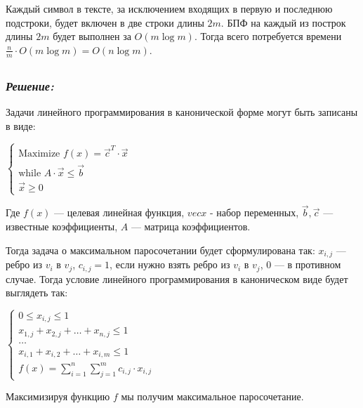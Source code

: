 \documentclass[a4paper, 12pt]{article}
\newcommand*\circled[1]{\tikz[baseline=(char.base)]{
            \node[shape=circle,draw,inner sep=2pt] (char) {#1};}}
\begin{document}
Каждый символ в тексте, за исключением входящих в первую и последнюю подстроки, будет включен в две строки длины $2m$. БПФ на каждый из построк длины $2m$ будет выполнен за $O(m\log{m})$. Тогда всего потребуется времени $\frac{n}{m}\cdot O(m\log{m})=O(n\log{m})$.

\subsection*{\circled{10}} 
\subsubsection*{\textit{Решение:}}

Задачи линейного программирования в канонической форме могут быть записаны в виде:

$\begin{cases}
\text{Maximize }f(x)=\vec{c}^T\cdot \vec{x}\\
\text{while }A\cdot \vec{x} \leq \vec{b}\\
\vec{x} \geq 0
\end{cases}$

Где $f(x)$ — целевая линейная функция, $vec{x}$ - набор переменных, $\vec{b}, \vec{c}$ — известные коэффициенты, $A$ — матрица коэффициентов.

Тогда задача о максимальном паросочетании будет сформулирована так: $x_{i,j}$ — ребро из $v_i$ в $v_j$, $c_{i,j} = 1$, если нужно взять ребро из $v_i$ в $v_j$, 0 — в противном случае. Тогда условие линейного программирования в каноническом виде будет выглядеть так:

$\begin{cases}
0 \leq x_{i,j} \leq 1\\
x_{1,j}+x_{2, j}+\dots+x_{n, j} \leq 1\\
\dots\\
x_{i,1}+x_{i, 2}+\dots+x_{i, m} \leq 1\\
f(x) = \sum_{i=1}^{n}\sum_{j=1}^m c_{i,j}\cdot x_{i,j}
\end{cases}$

Максимизируя функцию $f$ мы получим максимальное паросочетание.
\end{document}
